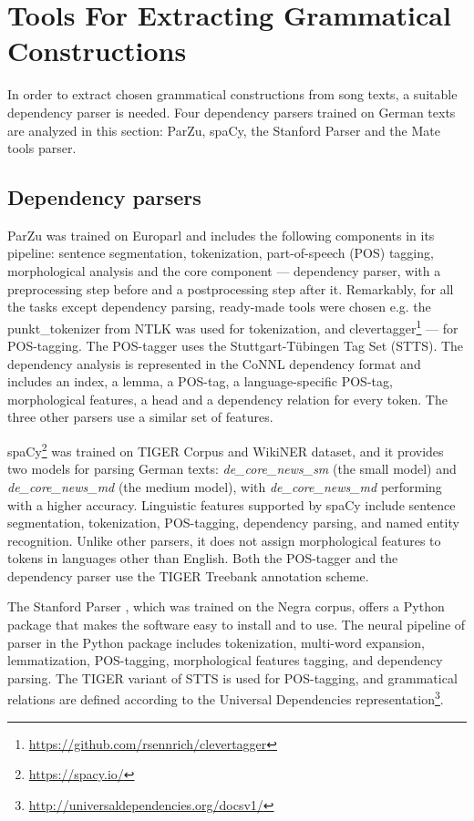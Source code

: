 \section{Tools For Extracting Grammatical Constructions} \label{sec:tools}

In order to extract chosen grammatical constructions from song texts, a suitable dependency parser is needed. Four dependency parsers trained on German texts are analyzed in this section: ParZu, spaCy, the Stanford Parser and the Mate tools parser.

\subsection{Dependency parsers}

ParZu \citep{Rico.2009} was trained on Europarl and includes the following components in its pipeline: sentence segmentation, tokenization, part-of-speech (POS) tagging, morphological analysis and the core component --- dependency parser, with a preprocessing step before and a postprocessing step after it. Remarkably, for all the tasks except dependency parsing, ready-made tools were chosen e.g. the punkt\_tokenizer from NTLK was used for tokenization, and clevertagger\footnote{\url{https://github.com/rsennrich/clevertagger}} --- for POS-tagging. The POS-tagger uses the Stuttgart-Tübingen Tag Set (STTS). The dependency analysis is represented in the CoNNL dependency format and includes an index, a lemma, a POS-tag, a language-specific POS-tag, morphological features, a head and a dependency relation for every token. The three other parsers use a similar set of features.

spaCy\footnote{\url{https://spacy.io/}} was trained on TIGER Corpus and WikiNER dataset, and it provides two models for parsing German texts: \textit{de\_core\_news\_sm} (the small model) and \textit{de\_core\_news\_md} (the medium model), with \textit{de\_core\_news\_md} performing with a higher accuracy. Linguistic features supported by spaCy include sentence segmentation, tokenization, POS-tagging, dependency parsing, and named entity recognition. Unlike other parsers, it does not assign morphological features to tokens in languages other than English. Both the POS-tagger and the dependency parser use the TIGER Treebank annotation scheme.

The Stanford Parser \citep{Qi.2018}, which was trained on the Negra corpus, offers a Python package that makes the software easy to install and to use. The neural pipeline of parser in the Python package includes tokenization, multi-word expansion, lemmatization, POS-tagging, morphological features tagging, and dependency parsing. The TIGER variant of STTS is used for POS-tagging, and grammatical relations are defined according to the Universal Dependencies representation\footnote{\url{http://universaldependencies.org/docsv1/}}.

